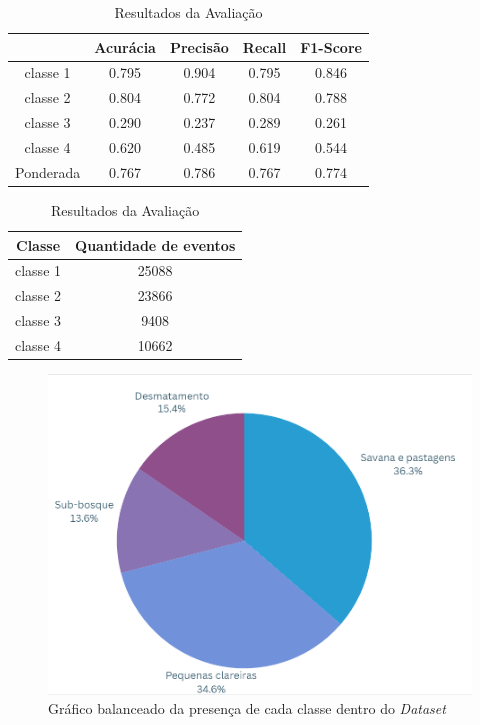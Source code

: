 \begin{table}[h]
    \centering
    \begin{tabular}{|c|c|c|c|c|}
        \hline
        & Acurácia & Precisão & Recall & F1-Score \\
        \hline
        classe 1 & 0.795 & 0.904 & 0.795 & 0.846 \\
        classe 2 & 0.804 & 0.772 & 0.804 & 0.788 \\
        classe 3 & 0.290 & 0.237 & 0.289 & 0.261 \\
        classe 4 & 0.620 & 0.485 & 0.619 & 0.544 \\
        \hline
        Ponderada & 0.767 & 0.786 & 0.767 & 0.774 \\
        \hline
    \end{tabular}


    \vspace{10pt}
    
    \begin{tabular}{|c|c|}
        \hline
        Classe & Quantidade de eventos \\
        \hline
        classe 1 & 25088 \\
        classe 2 & 23866 \\
        classe 3 & 9408 \\
        classe 4 & 10662 \\
        \hline
    \end{tabular}
    \caption{Resultados da Avaliação}
    \label{tab:resultados2}
\end{table}

\begin{figure}[H]
	\centering
	\begin{minipage}{0.98\linewidth}
		\centering
		\includegraphics[scale=0.6]{tg1/figuras/balanceado_pie.png}
		\caption{Gráfico balanceado da presença de cada classe dentro do \textit{Dataset}} \label{fig:lstm_com_balanc}
	\end{minipage}
\end{figure}


